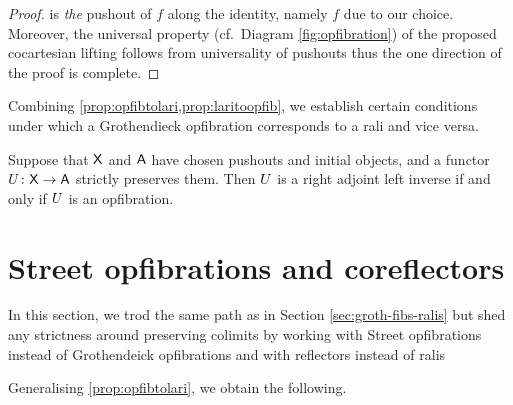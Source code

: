\documentclass{amsart}
\begin{document}
\begin{proof}
%
% 
is \emph{the} pushout of $f$ along the identity, namely $f$ due to our choice. Moreover, the universal property (cf.~Diagram \ref{fig:opfibration}) of the proposed cocartesian lifting follows from universality of pushouts thus the one direction of the proof is complete.
\end{proof}

Combining \cref{prop:opfibtolari,prop:laritoopfib}, we establish certain conditions under which a Grothendieck opfibration corresponds to a rali and vice versa. %

\begin{thm}\label{thm:mainthm}
Suppose that $\mathsf{X}$ and $\mathsf{A}$ have chosen pushouts and initial objects, and a functor $U\colon\mathsf{X}\to\mathsf{A}$ strictly preserves them. Then $U$ is a right adjoint left inverse if and only if $U$ is an opfibration.
\end{thm}


\section{Street opfibrations and coreflectors}\label{Streetfibs}

In this section, we trod the same path as in Section \ref{sec:groth-fibs-ralis} but shed any strictness around preserving colimits by working with Street opfibrations instead of Grothendeick opfibrations and with reflectors instead of ralis

Generalising \cref{prop:opfibtolari}, we obtain the following. 
\end{document}
